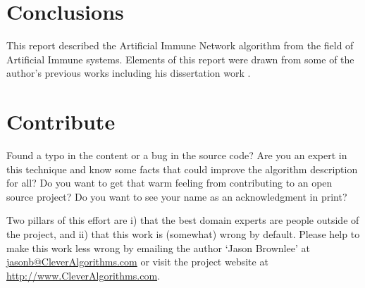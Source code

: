 \documentclass[a4paper, 11pt]{article}
\makeatletter
\newcommand{\myreportauthor}{Jason Brownlee}
\newcommand{\myreportemail}{jasonb@CleverAlgorithms.com}
\newcommand{\myreportwebsite}{http://www.CleverAlgorithms.com}
\makeatother
\begin{document}
% 
% 
\section{Conclusions}
\label{sec:conclusions}
This report described the Artificial Immune Network algorithm from the field of Artificial Immune systems.
Elements of this report were drawn from some of the author's previous works including his dissertation work \cite{Brownlee2008}.

% 
% 
\section{Contribute}
\label{sec:contribute}
Found a typo in the content or a bug in the source code? 
Are you an expert in this technique and know some facts that could improve the algorithm description for all?
Do you want to get that warm feeling from contributing to an open source project? 
Do you want to see your name as an acknowledgment in print?

Two pillars of this effort are i) that the best domain experts are people outside of the project, and ii) that this work is (somewhat) wrong by default. 
Please help to make this work less wrong by emailing the author `\myreportauthor' at \url{\myreportemail} or visit the project website at \url{\myreportwebsite}.



\end{document}
